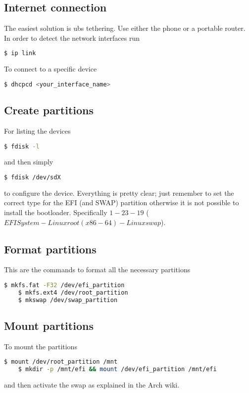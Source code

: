 \documentclass[12pt]{article}
\begin{document}
\subsection*{Internet connection}
The easiest solution is ubs tethering. Use either the phone or a portable router. In order to detect the network interfaces run
\begin{lstlisting}[language=bash]
    $ ip link
\end{lstlisting}
To connect to a specific device
\begin{lstlisting}[language=bash]
    $ dhcpcd <your_interface_name>
\end{lstlisting}

\subsection*{Create partitions}
For listing the devices
\begin{lstlisting}[language=bash]
    $ fdisk -l
\end{lstlisting}
and then simply
\begin{lstlisting}[language=bash]
    $ fdisk /dev/sdX
\end{lstlisting}
to configure the device. Everything is pretty clear; just remember to set the correct type for the EFI (and SWAP) partition otherwise it is not possible to install the bootloader. Specifically $1 - 23 - 19$ ($EFI System - Linux root (x86-64) - Linux swap$).

\subsection*{Format partitions}
This are the commands to format all the necessary partitions
\begin{lstlisting}[language=bash]
    $ mkfs.fat -F32 /dev/efi_partition
    $ mkfs.ext4 /dev/root_partition
    $ mkswap /dev/swap_partition
\end{lstlisting}

\subsection*{Mount partitions}
To mount the partitions
\begin{lstlisting}[language=bash]
    $ mount /dev/root_partition /mnt
    $ mkdir -p /mnt/efi && mount /dev/efi_partition /mnt/efi
\end{lstlisting}
and then activate the swap as explained in the Arch wiki.
\end{document}
